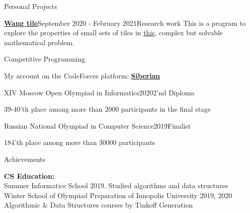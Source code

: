 \documentclass{resume} %
\begin{document}

\begin{rSection}{Personal Projects}

\begin{rSubsection}{\href{https://github.com/ElderlyPassionFruit/wang-tile}{\underline{\textbf{Wang tile}}}}{September 2020 - February 2021}{Research work}{}
This is a program to explore the properties of small sets of tiles in \href{https://en.wikipedia.org/wiki/Wang_tile}{\underline{this}}, complex but solvable mathematical problem.
\end{rSubsection}

\end{rSection}


\begin{rSection}{Competitive Programming}

My account on the CodeForces platform: \href{https://codeforces.com/profile/Siberian}{\underline{\textbf{Siberian}}}

\begin{rSubsection}{XIV Moscow Open Olympiad in Informatics}{2020}{2'nd Diploma}{}
\item 39-40'th place among more than 2000 participants in the final stage
\end{rSubsection}

\begin{rSubsection}{Russian National Olympiad in Computer Science}{2019}{Finalist}{}
\item 184'th place among more than 30000 participants
\end{rSubsection}

\end{rSection}


\begin{rSection}{Achievements}

 \textbf{CS Education:} \\
  Summer Informatics School 2019. Studied algorithms and data structures \\
  Winter School of Olympiad Preparation of Innopolis University 2019, 2020\\
  Algorithmic $\&$ Data Structures courses by Tinkoff Generation

\end{rSection}
\end{document}
